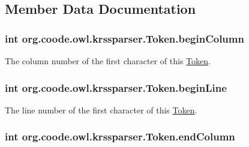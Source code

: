 \subsection{Member Data Documentation}
\hypertarget{classorg_1_1coode_1_1owl_1_1krssparser_1_1_token_ad30327f1cb70f7d684e54dbe729b33e2}{
\subsubsection[{begin\-Column}]{\setlength{\rightskip}{0pt plus 5cm}int org.\-coode.\-owl.\-krssparser.\-Token.\-begin\-Column}}\label{classorg_1_1coode_1_1owl_1_1krssparser_1_1_token_ad30327f1cb70f7d684e54dbe729b33e2}
The column number of the first character of this \hyperlink{classorg_1_1coode_1_1owl_1_1krssparser_1_1_token}{Token}. \hypertarget{classorg_1_1coode_1_1owl_1_1krssparser_1_1_token_a103ef807efb735cc865658e02f674eb0}{
\subsubsection[{begin\-Line}]{\setlength{\rightskip}{0pt plus 5cm}int org.\-coode.\-owl.\-krssparser.\-Token.\-begin\-Line}}\label{classorg_1_1coode_1_1owl_1_1krssparser_1_1_token_a103ef807efb735cc865658e02f674eb0}
The line number of the first character of this \hyperlink{classorg_1_1coode_1_1owl_1_1krssparser_1_1_token}{Token}. \hypertarget{classorg_1_1coode_1_1owl_1_1krssparser_1_1_token_a90b7d986bc8f81c7e351f4e942fd1690}{
\subsubsection[{end\-Column}]{\setlength{\rightskip}{0pt plus 5cm}int org.\-coode.\-owl.\-krssparser.\-Token.\-end\-Column}}\label{classorg_1_1coode_1_1owl_1_1krssparser_1_1_token_a90b7d986bc8f81c7e351f4e942fd1690}
